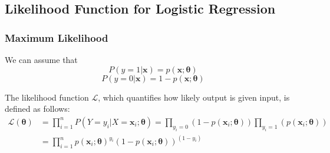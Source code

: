 \subsection{Likelihood Function for Logistic Regression}
\begin{frame}
\frametitle{Maximum Likelihood}

We can assume that
\[P(y = 1 | \mathbf{x}) = p(\mathbf{x}; \bm{\theta})\]
\[P(y = 0 | \mathbf{x}) = 1- p(\mathbf{x}; \bm{\theta})\]

The likelihood function $\mathcal{L}$, which quantifies how likely output is given input, is defined as follows:
\begin{equation}
\begin{aligned}
\mathcal{L}(\bm{\theta}) &= \prod_{i=1}^n P(Y = y_{i}  | X = \mathbf{x}_{i}; \bm{\theta}) = \prod_{y_{i} = 0 } (1-p(\mathbf{x}_{i}; \bm{\theta})) \prod_{y_{i} = 1 } (p(\mathbf{x}_{i}; \bm{\theta})) \\
&= \prod_{i=1}^{n} p(\mathbf{x}_{i}; \bm{\theta})^{y_{i}} (1-p(\mathbf{x}_{i}; \bm{\theta}))^{(1-{y_{i}})}
\end{aligned}
\end{equation}
\end{frame}

